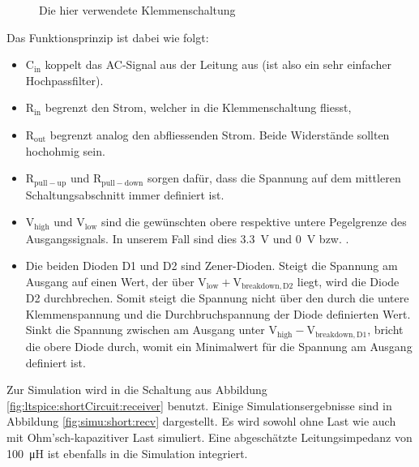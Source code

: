 \begin{figure}[h!tb]
    \centering
    
    \caption{Die hier verwendete Klemmenschaltung}
    \label{fig:circuit:clamper}
\end{figure}

Das Funktionsprinzip ist dabei wie folgt:

\begin{itemize}
    \tightlist
    \item
        $\mathrm{C_{in}}$ koppelt das AC-Signal aus  der Leitung aus (ist also
        ein sehr einfacher Hochpassfilter).
    \item
        $\mathrm{R_{in}}$ begrenzt den Strom,  welcher in die Klemmenschaltung
        fliesst,  \item $\mathrm{R_{out}}$  begrenzt analog  den abfliessenden
        Strom. Beide Widerst\"ande sollten hochohmig sein.
    \item
        $\mathrm{R_{pull-up}}$  und  $\mathrm{R_{pull-down}}$ sorgen  daf\"ur,
        dass  die   Spannung  auf  dem  mittleren   Schaltungsabschnitt  immer
        definiert ist.
    \item
        $\mathrm{V_{high}}$  und  $\mathrm{V_{low}}$  sind  die  gew\"unschten
        obere  respektive untere  Pegelgrenze des  Ausgangssignals. In unserem
        Fall sind dies \SI{3.3}{\volt} und \SI{0}{\volt} bzw. .
    \item
        Die   beiden  Dioden   D1   und  D2   sind  Zener-Dioden. Steigt   die
        Spannung  am Ausgang  auf einen  Wert, der  \"uber $\mathrm{V_{low}  +
        V_{breakdown,D2}}$ liegt, wird die Diode D2 durchbrechen. Somit steigt
        die Spannung nicht \"uber den durch die untere Klemmenspannung und die
        Durchbruchspannung  der  Diode  definierten Wert. Sinkt  die  Spannung
        zwischen  am  Ausgang  unter $\mathrm{V_{high}  -  V_{breakdown,D1}}$,
        bricht die obere Diode durch, womit ein Minimalwert f\"ur die Spannung
        am Ausgang definiert ist.
\end{itemize}

Zur   Simulation  wird   in     die   Schaltung  aus   Abbildung
\ref{fig:ltspice:shortCircuit:receiver}  benutzt. Einige Simulationsergebnisse
sind in  Abbildung \ref{fig:simu:short:recv} dargestellt. Es wird  sowohl ohne
Last  wie auch  mit  Ohm'sch-kapazitiver  Last simuliert. Eine  abgesch\"atzte
Leitungsimpedanz von  \SI{100}{\micro\henry} ist  ebenfalls in  die Simulation
integriert.

